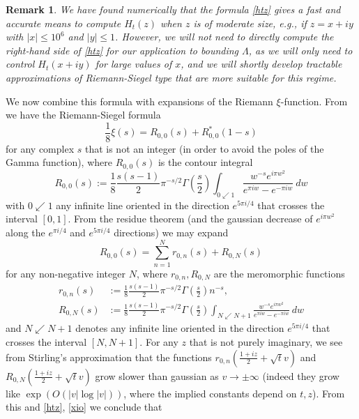 \documentclass[a4paper,11pt,twoside]{amsart}
\newtheorem{remark}[theorem]{Remark}
\begin{document}
\begin{remark}  We have found numerically that the formula \eqref{htz} gives a fast and accurate means to compute $H_t(z)$ when $z$ is of moderate size, e.g., if $z = x+iy$ with $|x| \leq 10^6$ and $|y| \leq 1$.  However, we will not need to directly compute the right-hand side of \eqref{htz} for our application to bounding $\Lambda$, as we will only need to control $H_t(x+iy)$ for large values of $x$, and we will shortly develop tractable approximations of Riemann-Siegel type that are more suitable for this regime.
\end{remark}

We now combine this formula with expansions of the Riemann $\xi$-function.  From \cite[(2.10.6)]{titch} we have the Riemann-Siegel formula
\begin{equation}\label{xio}
 \frac{1}{8} \xi(s) = R_{0,0}(s) + R_{0,0}^*(1-s) 
\end{equation}
for any complex $s$ that is not an integer (in order to avoid the poles of the Gamma function), where $R_{0,0}(s)$ is the contour integral
$$ R_{0,0}(s) := \frac{1}{8} \frac{s(s-1)}{2} \pi^{-s/2} \Gamma\left(\frac{s}{2}\right) \int_{0 \swarrow 1} \frac{w^{-s} e^{i\pi w^2}}{e^{\pi i w} - e^{-\pi i w}}\ dw$$
with $0 \swarrow 1$ any infinite line oriented in the direction $e^{5\pi i/4}$ that crosses the interval $[0,1]$.  From the residue theorem (and the gaussian decrease of $e^{i\pi w^2}$ along the $e^{\pi i/4}$ and $e^{5\pi i/4}$ directions) we may expand
$$ R_{0,0}(s) = \sum_{n=1}^N r_{0,n}(s)+ R_{0,N}(s)$$
for any non-negative integer $N$, where $r_{0,n}, R_{0,N}$ are the meromorphic functions
\begin{align}
 r_{0,n}(s) &:= \frac{1}{8} \frac{s(s-1)}{2} \pi^{-s/2} \Gamma\left(\frac{s}{2}\right) n^{-s},\label{ron-def} \\
R_{0,N}(s) &:= \frac{1}{8} \frac{s(s-1)}{2} \pi^{-s/2} \Gamma\left(\frac{s}{2}\right) \int_{N \swarrow N+1} \frac{w^{-s} e^{i\pi w^2}}{e^{\pi i w} - e^{-\pi i w}}\ dw\label{RON-def}
\end{align}
and $N \swarrow N+1$ denotes any infinite line oriented in the direction $e^{5\pi i /4}$ that crosses the interval $[N,N+1]$.  For any $z$ that is not purely imaginary, we see from Stirling's approximation that the functions $r_{0,n}(\frac{1+iz}{2} + \sqrt{t} v)$ and $R_{0,N}(\frac{1+iz}{2} + \sqrt{t} v)$ grow slower than gaussian as $v \to \pm \infty$ (indeed they grow like $\exp( O( |v| \log |v| ) )$, where the implied constants depend on $t,z$).  From this and
\eqref{htz}, \eqref{xio} we conclude that
\end{document}
